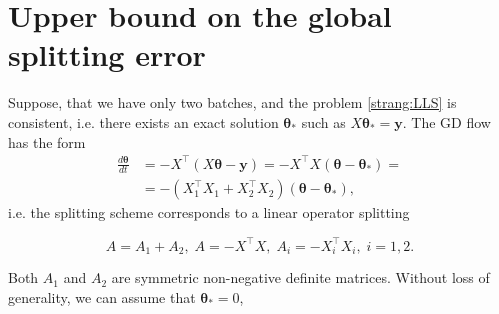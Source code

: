 \documentclass{article}
\newcommand{\vect}[1]{\boldsymbol{\mathbf{#1}}}
\begin{document}

\newpage
{ \small
}



\appendix


\section{Upper bound on the global splitting error}

Suppose, that we have only two batches, and the problem \eqref{strang:LLS} is consistent, i.e. there exists an exact solution $\vect{\theta}_*$ such as $X \vect{\theta}_* = \vect{y}$. The GD flow has the form
\begin{equation}\label{strang:model1}
\begin{split}
    \frac{d \vect{\theta}}{d t} &= -X^{\top} (X \vect{\theta} - \vect{y}) = -X^{\top} X(\vect{\theta} - \vect{\theta}_*) =\\ &= -(X_1^{\top} X_1 + X^{\top}_2 X_2)(\vect{\theta} - \vect{\theta}_*),
\end{split}
\end{equation}
i.e. the splitting scheme corresponds to a linear operator splitting

\begin{equation*}
A = A_1 + A_2, \; A = -X^{\top} X, \; A_i = -X^{\top}_i X_i, \; i = 1, 2.
\end{equation*}

Both $A_1$ and $A_2$ are symmetric non-negative definite matrices. Without loss of generality, we can assume that $\vect{\theta}_* = 0$,
\end{document}
